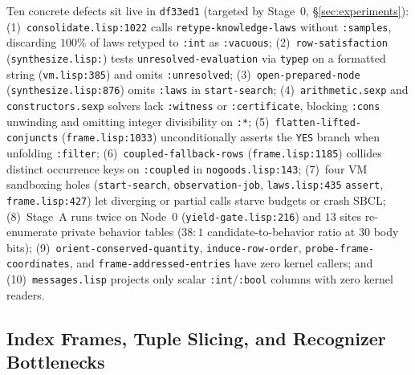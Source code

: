 \documentclass[12pt]{article}
\begin{document}
Ten concrete defects sit live in \texttt{df33ed1} (targeted by Stage~0, \S\ref{sec:experiments}):
(1)~\texttt{consolidate.\allowbreak lisp:1022} calls \texttt{retype-knowledge\allowbreak-laws} without \texttt{:samples}, discarding $100\%$ of laws retyped to \texttt{:int} as \texttt{:vacuous};
(2)~\texttt{row-\allowbreak satisfaction} (\texttt{synthesize.\allowbreak lisp:}) tests \texttt{unresolved\allowbreak-evaluation} via \texttt{typep} on a formatted string (\texttt{vm.lisp:385}) and omits \texttt{:unresolved};
(3)~\texttt{open-prepared\allowbreak-node} (\texttt{synthesize.\allowbreak lisp:876}) omits \texttt{:laws} in \texttt{start-search};
(4)~\texttt{arithmetic.\allowbreak sexp} and \texttt{constructors.\allowbreak sexp} solvers lack \texttt{:witness} or \texttt{:certificate}, blocking \texttt{:cons} unwinding and omitting integer divisibility on \texttt{:*};
(5)~\texttt{flatten-lifted\allowbreak-conjuncts} (\texttt{frame.lisp:1033}) unconditionally asserts the \texttt{YES} branch when unfolding \texttt{:filter};
(6)~\texttt{coupled-fallback\allowbreak-rows} (\texttt{frame.lisp:1185}) collides distinct occurrence keys on \texttt{:coupled} in \texttt{nogoods.lisp:143};
(7)~four VM sandboxing holes (\texttt{start-\allowbreak search}, \texttt{observation-\allowbreak job}, \texttt{laws.lisp:435} \texttt{assert}, \texttt{frame.lisp:427}) let diverging or partial calls starve budgets or crash SBCL;
(8)~Stage~A runs twice on Node~$0$ (\texttt{yield-\allowbreak gate.lisp:216}) and $13$ sites re-enumerate private behavior tables ($38{:}1$ candidate-to-behavior ratio at $30$ body bits);
(9)~\texttt{orient-conserved\allowbreak-quantity}, \texttt{induce-row\allowbreak-order}, \texttt{probe-frame\allowbreak-coordinates}, and \texttt{frame-addressed\allowbreak-entries} have zero kernel callers; and
(10)~\texttt{messages.\allowbreak lisp} projects only scalar \texttt{:int}/\texttt{:bool} columns with zero kernel readers.

\subsection{Index Frames, Tuple Slicing, and Recognizer Bottlenecks}
\label{sec:audit-index}
\end{document}
